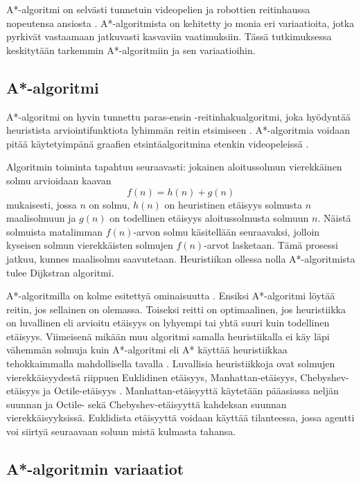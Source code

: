 \documentclass[utf8]{gradu3}
\begin{document}
A*-algoritmi on selvästi tunnetuin videopelien ja robottien reitinhaussa nopeutensa ansiosta \parencite{abd2015comprehensive,botea2013pathfinding,cui2011based}. A*-algoritmista on kehitetty jo monia eri variaatioita, jotka pyrkivät vastaamaan jatkuvasti kasvaviin vaatimuksiin. Tässä tutkimuksessa keskitytään tarkemmin A*-algoritmiin ja sen variaatioihin.

\subsection{A*-algoritmi}

A*-algoritmi on hyvin tunnettu paras-ensin -reitinhakualgoritmi, joka hyödyntää heuristista arviointifunktiota lyhimmän reitin etsimiseen \parencite{cui2011based,duchovn2014path}. A*-algoritmia voidaan pitää käytetyimpänä graafien etsintäalgoritmina etenkin videopeleissä \parencite{botea2013pathfinding,lawande2022systematic}.

Algoritmin toiminta tapahtuu seuraavasti: jokainen aloitussolmun vierekkäinen solmu arvioidaan kaavan \[f(n)=h(n)+g(n)\] mukaisesti, jossa \(n\) on solmu, \(h(n)\) on heuristinen etäisyys solmusta \(n\) maalisolmuun ja \(g(n)\) on todellinen etäisyys aloitussolmusta solmuun \(n\). Näistä solmuista matalimman \(f(n)\)-arvon solmu käsitellään seuraavaksi, jolloin kyseisen solmun vierekkäisten solmujen \(f(n)\)-arvot lasketaan. Tämä prosessi jatkuu, kunnes maalisolmu saavutetaan. Heuristiikan ollessa nolla A*-algoritmista tulee Dijkstran algoritmi.

A*-algoritmilla on kolme esitettyä ominaisuutta \parencite{hart1968formal}. Ensiksi A*-algoritmi löytää reitin, jos sellainen on olemassa. Toiseksi reitti on optimaalinen, jos heuristiikka on luvallinen eli arvioitu etäisyys on lyhyempi tai yhtä suuri kuin todellinen etäisyys. Viimeisenä mikään muu algoritmi samalla heuristiikalla ei käy läpi vähemmän solmuja kuin A*-algoritmi eli A* käyttää heuristiikkaa tehokkaimmalla mahdollisella tavalla \parencite{cui2011based,hart1968formal}. Luvallisia heuristiikkoja ovat solmujen vierekkäisyydestä riippuen Euklidinen etäisyys, Manhattan-etäisyys, Chebyshev-etäisyys ja Octile-etäisyys \parencite{duchovn2014path,botea2013pathfinding}. Manhattan-etäisyyttä käytetään pääasiassa neljän suunnan ja Octile- sekä Chebyshev-etäisyyttä kahdeksan suunnan vierekkäisyyksissä. Euklidista etäisyyttä voidaan käyttää tilanteessa, jossa agentti voi siirtyä seuraavaan soluun mistä kulmasta tahansa.

\subsection{A*-algoritmin variaatiot}
\label{avariaatiot}
\end{document}
